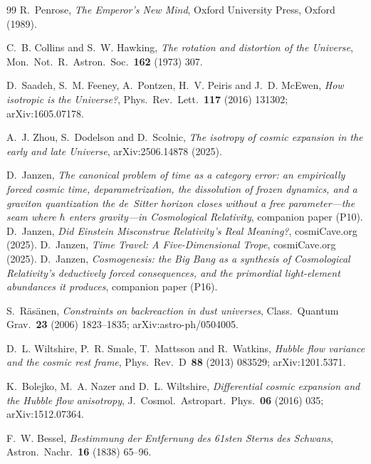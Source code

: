\documentclass[11pt,a4paper]{article}
\begin{document}
\begin{thebibliography}{99}
R.~Penrose,
\emph{The Emperor's New Mind},
Oxford University Press, Oxford (1989).

C.~B. Collins and S.~W. Hawking,
\emph{The rotation and distortion of the Universe},
Mon.~Not.~R.~Astron.~Soc.~\textbf{162} (1973) 307.

D.~Saadeh, S.~M. Feeney, A.~Pontzen, H.~V. Peiris and J.~D. McEwen,
\emph{How isotropic is the Universe?},
Phys.~Rev.~Lett.~\textbf{117} (2016) 131302; arXiv:1605.07178.

A.~J. Zhou, S.~Dodelson and D.~Scolnic,
\emph{The isotropy of cosmic expansion in the early and late Universe},
arXiv:2506.14878 (2025).

D.~Janzen,
\emph{The canonical problem of time as a category error: an empirically forced cosmic time, deparametrization, the dissolution of frozen dynamics, and a graviton quantization the de~Sitter horizon closes without a free parameter---the seam where $\hbar$ enters gravity---in Cosmological Relativity}, companion paper (P10).
D.~Janzen,
\emph{Did Einstein Misconstrue Relativity's Real Meaning?},
cosmiCave.org (2025).
D.~Janzen,
\emph{Time Travel: A Five-Dimensional Trope},
cosmiCave.org (2025).
 D.~Janzen, \emph{Cosmogenesis: the Big Bang as a synthesis of Cosmological Relativity's deductively forced consequences, and the primordial light-element abundances it produces}, companion paper (P16).

S.~R\"as\"anen,
\emph{Constraints on backreaction in dust universes},
Class.~Quantum Grav.~\textbf{23} (2006) 1823--1835; arXiv:astro-ph/0504005.

D.~L. Wiltshire, P.~R. Smale, T.~Mattsson and R.~Watkins,
\emph{Hubble flow variance and the cosmic rest frame},
Phys.~Rev.~D~\textbf{88} (2013) 083529; arXiv:1201.5371.

K.~Bolejko, M.~A. Nazer and D.~L. Wiltshire,
\emph{Differential cosmic expansion and the Hubble flow anisotropy},
J.~Cosmol.~Astropart.~Phys.~\textbf{06} (2016) 035; arXiv:1512.07364.

F.~W. Bessel,
\emph{Bestimmung der Entfernung des 61sten Sterns des Schwans},
Astron.~Nachr.~\textbf{16} (1838) 65--96.
\end{thebibliography}



\end{document}
